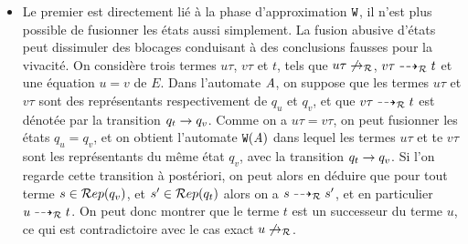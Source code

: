 \begin{itemize}
\item Le premier est directement lié à la phase d'approximation $\mathtt{W}$,
  il n'est plus possible de fusionner les états aussi simplement.
  La fusion abusive d'états peut dissimuler des blocages conduisant à des conclusions fausses pour la vivacité.
  On considère trois termes $u\tau$, $v\tau$ et $t$, tels que $u\tau \not\rightarrow_\mathcal R$, $v\tau \dashrightarrow_\mathcal R t$ et 
  une équation $u = v$ de $E$.
  Dans l'automate $\mathit A$, on suppose que les termes $u\tau$ et $v\tau$ sont des représentants respectivement de $q_u$ et $q_v$,
  et que $v\tau \dashrightarrow_\mathcal R t$ est dénotée par la transition $q_t \rightarrow q_v$. Comme on a $u\tau = v\tau$, 
  on peut fusionner les états $q_u = q_v$, et on obtient l'automate $\mathtt{W}(\mathit A)$ dans lequel les termes
  $u\tau$ et te $v\tau$ sont les représentants du même état $q_v$,
  avec la transition $q_t \rightarrow q_v$. Si l'on regarde cette transition à postériori, on peut alors en déduire
  que pour tout terme $s \in \mathcal R ep(q_v)$, et $s' \in \mathcal R ep(q_t)$ alors on a $s \dashrightarrow_\mathcal R s'$, et
  en particulier $u \dashrightarrow_\mathcal R t$. On peut donc montrer que le terme $t$ est un successeur du terme
  $u$, ce qui est contradictoire avec le cas exact $u \not\rightarrow_\mathcal R$.


\end{itemize}
